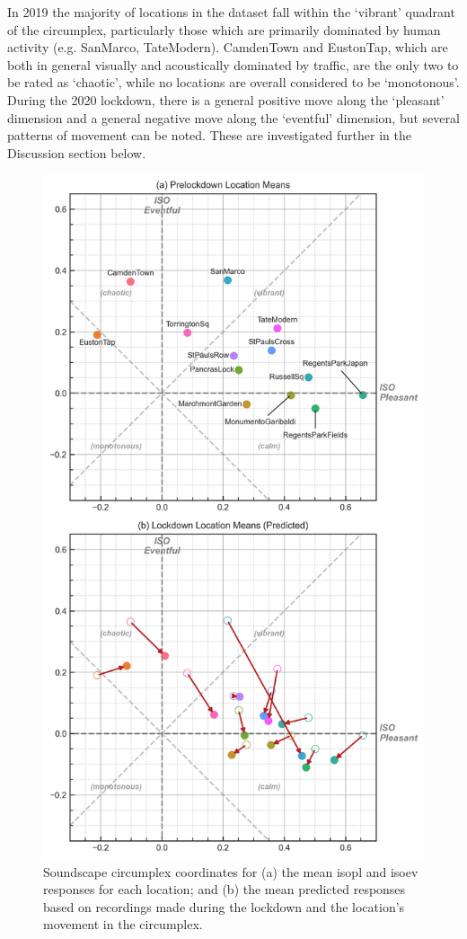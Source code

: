    In 2019 the majority of locations in the dataset fall within the `vibrant' quadrant of the circumplex, particularly those which are primarily dominated by human activity (e.g. SanMarco, TateModern). CamdenTown and EustonTap, which are both in general visually and acoustically dominated by traffic, are the only two to be rated as `chaotic', while no locations are overall considered to be `monotonous'. During the 2020 lockdown, there is a general positive move along the `pleasant' dimension and a general negative move along the `eventful' dimension, but several patterns of movement can be noted. These are investigated further in the Discussion section below.

   \begin{figure}
     \caption{Soundscape circumplex coordinates for (a) the mean \gls{isopl} and \gls{isoev} responses for each location; and (b) the mean predicted responses based on recordings made during the lockdown and the location's movement in the circumplex. \label{fig:circumplex-locations}}
     \centering
     \includegraphics[width=.75\textwidth]{Figures/Lockdown Figure5.jpg}
   \end{figure}

